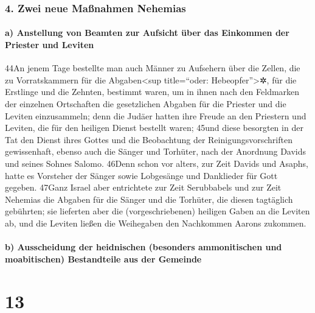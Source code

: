 \hypertarget{zwei-neue-mauxdfnahmen-nehemias}{%
\subsubsection{4. Zwei neue Maßnahmen
Nehemias}\label{zwei-neue-mauxdfnahmen-nehemias}}

\hypertarget{a-anstellung-von-beamten-zur-aufsicht-uxfcber-das-einkommen-der-priester-und-leviten}{%
\paragraph{a) Anstellung von Beamten zur Aufsicht über das Einkommen der
Priester und
Leviten}\label{a-anstellung-von-beamten-zur-aufsicht-uxfcber-das-einkommen-der-priester-und-leviten}}

44An jenem Tage bestellte man auch Männer zu Aufsehern über die Zellen,
die zu Vorratskammern für die Abgaben\textless sup title=``oder:
Hebeopfer''\textgreater✲, für die Erstlinge und die Zehnten, bestimmt
waren, um in ihnen nach den Feldmarken der einzelnen Ortschaften die
gesetzlichen Abgaben für die Priester und die Leviten einzusammeln; denn
die Judäer hatten ihre Freude an den Priestern und Leviten, die für den
heiligen Dienst bestellt waren; 45und diese besorgten in der Tat den
Dienst ihres Gottes und die Beobachtung der Reinigungsvorschriften
gewissenhaft, ebenso auch die Sänger und Torhüter, nach der Anordnung
Davids und seines Sohnes Salomo. 46Denn schon vor alters, zur Zeit
Davids und Asaphs, hatte es Vorsteher der Sänger sowie Lobgesänge und
Danklieder für Gott gegeben. 47Ganz Israel aber entrichtete zur Zeit
Serubbabels und zur Zeit Nehemias die Abgaben für die Sänger und die
Torhüter, die diesen tagtäglich gebührten; sie lieferten aber die
(vorgeschriebenen) heiligen Gaben an die Leviten ab, und die Leviten
ließen die Weihegaben den Nachkommen Aarons zukommen.

\hypertarget{b-ausscheidung-der-heidnischen-besonders-ammonitischen-und-moabitischen-bestandteile-aus-der-gemeinde}{%
\paragraph{b) Ausscheidung der heidnischen (besonders ammonitischen und
moabitischen) Bestandteile aus der
Gemeinde}\label{b-ausscheidung-der-heidnischen-besonders-ammonitischen-und-moabitischen-bestandteile-aus-der-gemeinde}}

\hypertarget{section-12}{%
\section{13}\label{section-12}}

